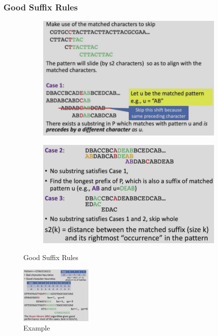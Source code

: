 \subsubsection{Good Suffix Rules}

\begin{figure}[H]
    \centering
    \begin{subfigure}{0.309\textwidth}
        \centering
        \includegraphics[width=\textwidth]{pic/DAA7/Good Suffix Rules1}
    \end{subfigure}
    \begin{subfigure}{0.309\textwidth}
        \centering
        \includegraphics[width=\textwidth]{pic/DAA7/Good Suffix Rules2}
    \end{subfigure}
    \caption{Good Suffix Rules}
\end{figure}

\begin{figure}[H]
    \centering
    \includegraphics[width=0.309\textwidth]{pic/DAA7/BM Algorithm exp2.png}
    \caption{Example}
\end{figure}


